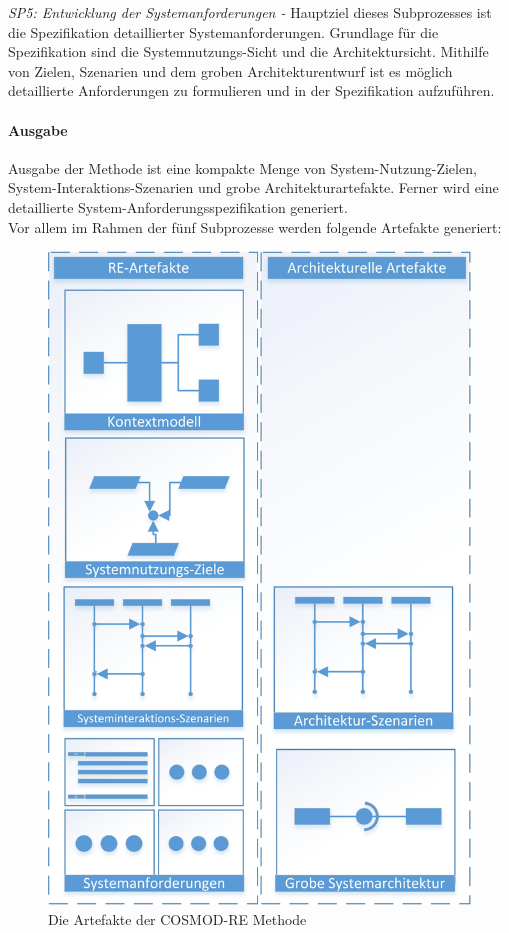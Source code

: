 \emph{SP5: Entwicklung der Systemanforderungen -}
Hauptziel dieses Subprozesses ist die Spezifikation detaillierter Systemanforderungen. Grundlage f\"ur die Spezifikation sind die Systemnutzungs-Sicht und die Architektursicht. Mithilfe von Zielen, Szenarien und dem groben Architekturentwurf ist es m\"oglich detaillierte Anforderungen zu formulieren und in der Spezifikation aufzuf\"uhren.\\

\paragraph{Ausgabe}
Ausgabe der Methode ist eine kompakte Menge von System-Nutzung-Zielen, System-Interaktions-Szenarien und grobe Architekturartefakte. Ferner wird eine detaillierte System-Anforderungsspezifikation generiert.\\

Vor allem im Rahmen der f\"unf Subprozesse werden folgende Artefakte generiert:\\

\begin{figure}[h]
	\centering
	\includegraphics[scale=0.8]{artefakte.jpg} 
	\caption{Die Artefakte der COSMOD-RE Methode}\label{art}
\end{figure}

